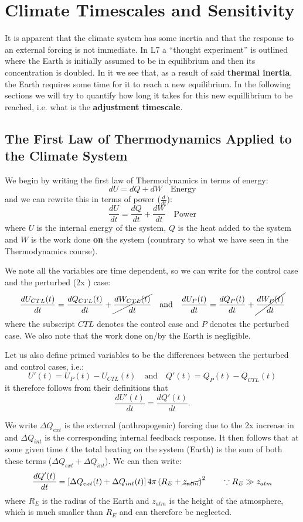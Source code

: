 \section{Climate Timescales and Sensitivity}
\label{sec:climate-timescales}

It is apparent that the climate system has some inertia and that the response to
an external forcing is not immediate.
In L7 a ``thought experiment'' is outlined where the Earth is initially assumed 
to be in equilibrium and then its  concentration is doubled. In it we
see that, as a result of said \textbf{thermal inertia}, the Earth requires 
some time for it to reach a new equilibrium. In the following sections we will 
try to quantify how long it takes for this new equillibrium to be reached, i.e.
what is the \textbf{adjustment timescale}.

\subsection{The First Law of Thermodynamics Applied to the Climate System}
\label{sec:first-law-thermo}

We begin by writing the first law of Thermodynamics in terms of energy:
$$
dU = dQ + dW \quad \text{Energy}
$$
and we can rewrite this in terms of power ($\frac{d}{dt}$):
$$
\frac{dU}{dt} = \frac{dQ}{dt} + \frac{dW}{dt} \quad \text{Power}
$$
where $U$ is the internal energy of the system, $Q$ is the heat added to the system and $W$ is the work done \textbf{on}
the system (countrary to what we have seen in the Thermodynamics course).

We note all the variables are time dependent, so we can write for the control case and the perturbed (2x ) case:
$$
\frac{dU_{CTL}(t)}{dt} = \frac{dQ_{CTL}(t)}{dt} + \cancel{\frac{dW_{CTL}(t)}{dt}} \quad \text{and} \quad 
\frac{dU_{P}(t)}{dt} = \frac{dQ_{P}(t)}{dt} + \cancel{\frac{dW_{P}(t)}{dt}}
$$
where the subscript $CTL$ denotes the control case and $P$ denotes the perturbed case. We also note that the work done
on/by the Earth is negligible.

Let us also define primed variables to be the differences between the perturbed and control cases, i.e.:
$$
U'(t) = U_{P}(t) - U_{CTL}(t) \quad \text{and} \quad Q'(t) = Q_{P}(t) - Q_{CTL}(t)
$$
it therefore follows from their definitions that
$$
\frac{dU'(t)}{dt} = \frac{dQ'(t)}{dt}.
$$

We write $\Delta Q_{ext}$ is the external (anthropogenic) forcing due to the 2x
increase in  and $\Delta Q_{int}$ is the corresponding internal feedback
response. It then follows that at some given time $t$ the total heating on the
system (Earth) is the sum of both these terms ($\Delta Q_{ext} + \Delta Q_{int}$).
We can then write:
$$
\frac{dQ'(t)}{dt} = \left[\Delta Q_{ext}(t) + \Delta Q_{int}(t)\right] 4\pi 
\left(R_E + \cancel{z_{atm}}\right)^2 \quad \quad \because R_E \gg z_{atm}
$$ 
where $R_E$ is the radius of the Earth and $z_{atm}$ is the height of the
atmosphere, which is much smaller than $R_E$ and can therefore be neglected.

